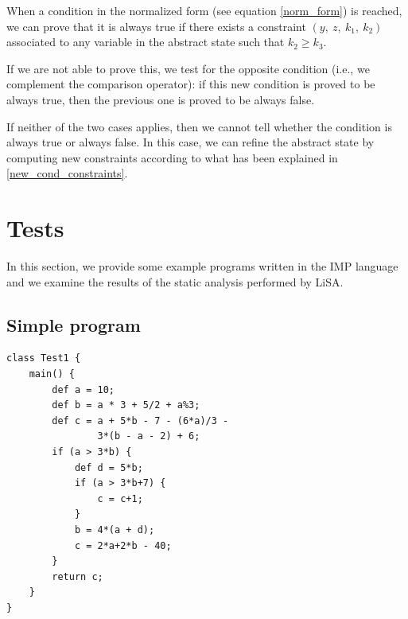 \documentclass{article}
\newcommand{\spc}{\:}
\newcommand{\constraint}[4]{(#1,\spc #2,\spc #3,\spc #4)}
\begin{document}
When a condition in the normalized form (see equation \ref{norm_form}) is reached, we can prove that it is always true if there exists a constraint $\constraint{y}{z}{k_1}{k_2}$ associated to any variable in the abstract state such that $k_2 \geq k_3$.

If we are not able to prove this, we test for the opposite condition (i.e., we complement the comparison operator): if this new condition is proved to be always true, then the previous one is proved to be always false.

If neither of the two cases applies, then we cannot tell whether the condition is always true or always false. In this case, we can refine the abstract state by computing new constraints according to what has been explained in \ref{new_cond_constraints}.


\section{Tests}
In this section, we provide some example programs written in the IMP language \cite{imp} and we examine the results of the static analysis performed by LiSA.
\subsection{Simple program}
\begin{lstlisting}
class Test1 {
    main() {
        def a = 10;
        def b = a * 3 + 5/2 + a%3;
        def c = a + 5*b - 7 - (6*a)/3 -
                3*(b - a - 2) + 6;
        if (a > 3*b) {
            def d = 5*b;
            if (a > 3*b+7) {
                c = c+1;
            }
            b = 4*(a + d);
            c = 2*a+2*b - 40;
        }
        return c;
    }
}
\end{lstlisting}

\end{document}
